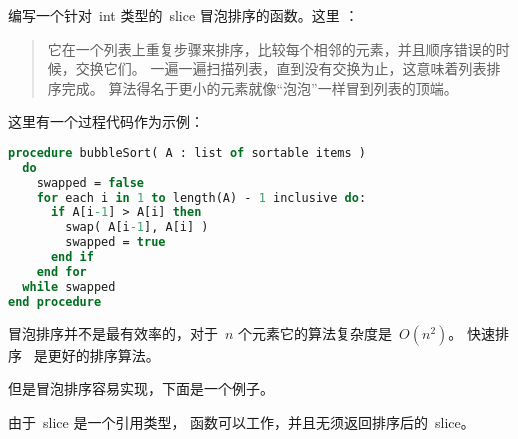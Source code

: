 \begin{Exercise}[title={冒泡排序},difficulty=1]
\label{ex:bubble}
\Question\label{ex:bubble q1} 编写一个针对~int 类型的~slice 冒泡排序的函数。这里 \cite{bubblesort}：
\begin{quote}
它在一个列表上重复步骤来排序，比较每个相邻的元素，并且顺序错误的时候，交换它们。
一遍一遍扫描列表，直到没有交换为止，这意味着列表排序完成。
算法得名于更小的元素就像``泡泡''一样冒到列表的顶端。
\end{quote}

\cite{bubblesort} 这里有一个过程代码作为示例：
\begin{lstlisting}[language=pascal]
procedure bubbleSort( A : list of sortable items )
  do
    swapped = false
    for each i in 1 to length(A) - 1 inclusive do:
      if A[i-1] > A[i] then
        swap( A[i-1], A[i] )
        swapped = true
      end if
    end for
  while swapped
end procedure
\end{lstlisting}
\end{Exercise}

\begin{Answer}
\Question 
冒泡排序并不是最有效率的，对于~$n$ 个元素它的算法复杂度是~$O(n^2)$。
快速排序~\cite{quicksort} 是更好的排序算法。

但是冒泡排序容易实现，下面是一个例子。


由于~slice 是一个引用类型， 函数可以工作，并且无须返回排序后的~slice。
\end{Answer}

